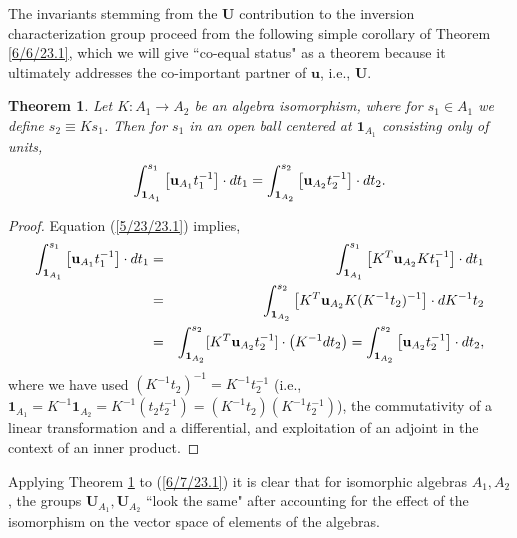 \documentclass{amsart}
\numberwithin{equation}{section}
\newtheorem{theorem}{Theorem}
\theoremstyle{definition}
\numberwithin{theorem}{section}
\begin{document}
The invariants stemming from the $\mathbf{U}$ contribution to the inversion characterization group proceed from the following simple corollary of Theorem \ref{6/6/23.1}, which we will give ``co-equal status" as a theorem because it ultimately addresses the co-important  partner of $\mathbf{u}$, i.e., $\mathbf{U}$. 

\enlargethispage{1cm}
\begin{theorem}\label{6/6/23.2} Let $K:A_1\rightarrow A_2$ be an algebra isomorphism, where for $s_1\in A_1$ we define $s_2\equiv Ks_1$.  Then for $s_1$ in an open ball centered at $\mathbf{1}_{A_1}$ consisting only of units, \[ \int_{{\bf 1}_{A_1}}^{s_1} \left[\mathbf{u}_{A_1}t_1^{-1}\right]\cdot dt_1 
= \int_{{\bf 1}_{A_2}}^{s_2} \left[\mathbf{u}_{A_2}t_2^{-1}\right]\cdot dt_2 . \] \end{theorem}

\begin{proof} 
Equation (\ref{5/23/23.1}) implies,
\begin{eqnarray*} \int_{{\bf 1}_{A_1}}^{s_1} \left[\mathbf{u}_{A_1}t_1^{-1}\right]\cdot dt_1 &=& \int_{{\bf 1}_{A_1}}^{s_1} \left[ K^T\mathbf{u}_{A_2}Kt_1^{-1}\right]\cdot dt_1 \\ &=& 
\int_{{\bf 1}_{A_2}}^{s_2} \left[ K^T\mathbf{u}_{A_2}K (K^{-1}t_2)^{-1}\right]\cdot dK^{-1}t_2 \\ &=& \int_{{\bf 1}_{A_2}}^{s_2} [K^T\mathbf{u}_{A_2}t_2^{-1}]\cdot \left(K^{-1}dt_2\right) = \int_{{\bf 1}_{A_2}}^{s_2} \left[\mathbf{u}_{A_2}t_2^{-1}\right]\cdot dt_2, 
\end{eqnarray*}
where we have used $(K^{-1}t_2)^{-1} = K^{-1}t_2^{-1}$ (i.e., $\mathbf{1}_{A_1} = K^{-1}\mathbf{1}_{A_2} = K^{-1}(t_2t_2^{-1}) = (K^{-1}t_2)(K^{-1}t_2^{-1})$), the commutativity of a linear transformation and a differential, and exploitation of an adjoint in the context of an inner product.
\end{proof}



Applying Theorem \ref{6/6/23.2} to (\ref{6/7/23.1}) it is clear that for isomorphic algebras $A_1,A_2$, the groups $\mathbf{U}_{A_1},  \mathbf{U}_{A_2}$ ``look the same" after accounting for the effect of the isomorphism on the vector space of elements of the algebras.
\end{document}
